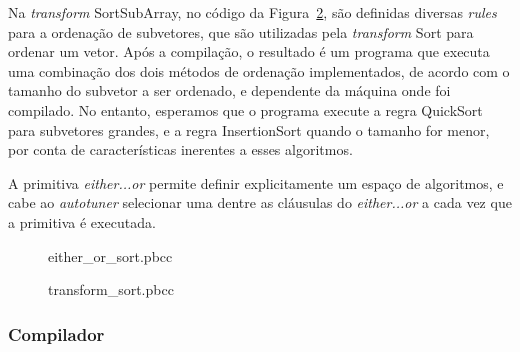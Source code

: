 \documentclass[a4paper, 11pt]{article}
\begin{document}
Na \emph{transform} SortSubArray, no código da Figura~\ref{fig:sortpbcc}, são 
definidas diversas \emph{rules} para a ordenação de subvetores, que
são utilizadas pela \emph{transform} Sort para ordenar um vetor. Após a
compilação, o resultado é um programa que executa uma combinação dos dois
métodos de ordenação implementados, de acordo com o tamanho do subvetor a
ser ordenado, e dependente da máquina onde foi compilado. No entanto, esperamos
que o programa execute a regra QuickSort para subvetores grandes, e a 
regra InsertionSort quando o tamanho for menor, por conta de características
inerentes a esses algoritmos.

A primitiva \emph{either...or} permite definir explicitamente um espaço
de algoritmos, e cabe ao \emph{autotuner} selecionar uma dentre as cláusulas
do \emph{either...or} a cada vez que a primitiva é executada.

\begin{figure}[H]
    \centering
    
    \caption{either\_or\_sort.pbcc}
    \label{fig:sort2pbcc}
\end{figure}

\begin{figure}[H]
    \centering
    
    \caption{transform\_sort.pbcc}
    \label{fig:sortpbcc}
\end{figure}

\subsubsection{Compilador}
\end{document}
